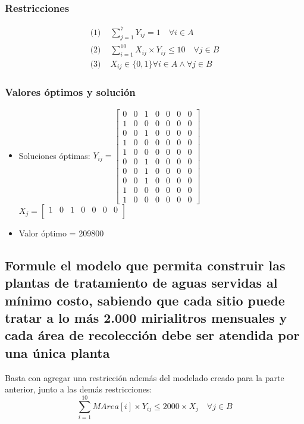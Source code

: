 \documentclass[a4paper,12pt]{article}
\begin{document}
\subsubsection{Restricciones}
\begin{equation*}
	\begin{split}
		\text{(1) }&\sum_{j=1}^{7}Y_{ij}=1\quad \forall i\in A\\
		\text{(2) }&\sum_{i=1}^{10}X_{ij}\times Y_{ij}\leq 10\quad \forall j\in B\\
		\text{(3) }&X_{ij}\in\{0,1\}\forall i\in A \wedge \forall j\in B
	\end{split}
\end{equation*}
\subsubsection{Valores óptimos y solución}
\begin{itemize}
	\item Soluciones óptimas: $Y_{ij}=
	\begin{bmatrix}
	0 & 0 & 1 & 0 & 0 & 0 & 0\\
	1 & 0 & 0 & 0 & 0 & 0 & 0\\
	0 & 0 & 1 & 0 & 0 & 0 & 0\\
	1 & 0 & 0 & 0 & 0 & 0 & 0\\
	1 & 0 & 0 & 0 & 0 & 0 & 0\\
	0 & 0 & 1 & 0 & 0 & 0 & 0\\
	0 & 0 & 1 & 0 & 0 & 0 & 0\\
	0 & 0 & 1 & 0 & 0 & 0 & 0\\
	1 & 0 & 0 & 0 & 0 & 0 & 0\\
	1 & 0 & 0 & 0 & 0 & 0 & 0
	\end{bmatrix}$\\
	
	$X_{j}=
	\begin{bmatrix}
	1 & 0 & 1 & 0 & 0 & 0 & 0\\
	\end{bmatrix}$
	\item Valor óptimo = 209800
\end{itemize}
\subsection{Formule  el  modelo  que  permita  construir  las  plantas  de  tratamiento  de  aguas  servidas  al  mínimo  costo, sabiendo que cada sitio puede  tratar a lo más 2.000 mirialitros mensuales y cada área de recolección debe ser atendida por una única planta}
Basta con agregar una restricción además del modelado creado para la parte anterior, junto a las demás restricciones:
\begin{equation*}
	\sum_{i=1}^{10}MArea[i]\times Y_{ij}\leq 2000\times X_j \quad \forall j \in B
\end{equation*}
\end{document}
